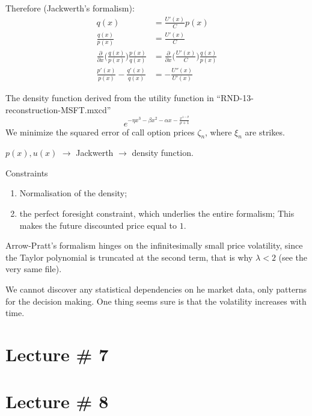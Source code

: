 \documentclass[a4paper]{article}
\begin{document}
Therefore (Jackwerth's formalism):
\begin{align*}
	q(x) &= \frac{U'(x)}{C}p(x)\\
	\frac{q(x)}{p(x)} &= \frac{U'(x)}{C}\\
	\frac{\partial}{\partial x}\Big(\frac{q(x)}{p(x)}\Big)\frac{p(x)}{q(x)} &= \frac{\partial}{\partial x}\Big(\frac{U'(x)}{C}\Big) \frac{q(x)}{p(x)}\\
	\frac{p'(x)}{p(x)} - \frac{q'(x)}{q(x)} &= - \frac{U''(x)}{U'(x)}
\end{align*}

The density function derived from the utility function in ``RND-13-reconstruction-MSFT.mxcd''
\[e^{-\eta x^3 - \beta x^2 - \alpha x - \frac{x^{1-\theta}}{\rho+1} }\]
We minimize the squared error of call option prices $\zeta_n$, where $\xi_n$ are strikes.

$p(x), u(x)$ $\to$ Jackwerth $\to$ density function.

Constraints \begin{enumerate}
	\item Normalisation of the density;
	\item the perfect foresight constraint, which underlies the entire formalism; This makes the future discounted price equal to $1$.
\end{enumerate}

Arrow-Pratt's formalism hinges on the infinitesimally small price volatility, since the Taylor polynomial is truncated at the second term, that is why $\lambda<2$ (see the very same file).


We cannot discover any statistical dependencies on he market data, only patterns for the decision making. One thing seems sure is that the volatility increases with time.



\section{Lecture \# 7} %
\label{sec:lecture_#_7}


\section{Lecture \# 8} %
\label{sec:lecture_#_8}

\end{document}
